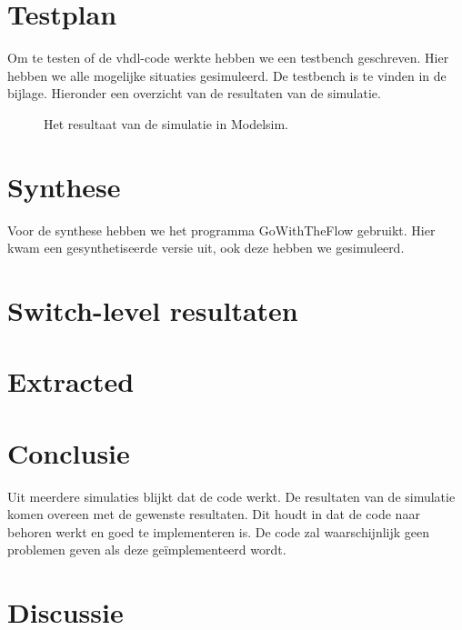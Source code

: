 \documentclass{scrartcl}  %
\begin{document}
\section{Testplan}
Om te testen of de vhdl-code werkte hebben we een testbench geschreven. Hier hebben we alle mogelijke situaties gesimuleerd. De testbench is te vinden in de bijlage. Hieronder een overzicht van de resultaten van de simulatie.
\begin{figure}[H]
\centering
		\setlength{}
		\setlength{}
		
		\caption{Het resultaat van de simulatie in Modelsim.}
		\label{fig:sim}
\end{figure}
\section{Synthese}
Voor de synthese hebben we het programma GoWithTheFlow gebruikt. Hier kwam een gesynthetiseerde versie uit, ook deze hebben we gesimuleerd.
\section{Switch-level resultaten}
\section{Extracted}
\section{Conclusie}
Uit meerdere simulaties blijkt dat de code werkt. De resultaten van de simulatie komen overeen met de gewenste resultaten. Dit houdt in dat de code naar behoren werkt en goed te implementeren is. De code zal waarschijnlijk geen problemen geven als deze geïmplementeerd wordt.
\section{Discussie}
\end{document}
